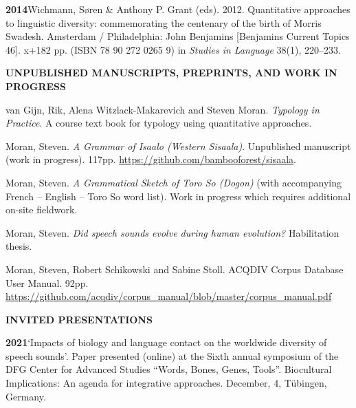 \documentclass[11pt]{article}
\newcommand{\hangpara}{
 \setlength{\parindent}{0in} %
 \hangindent=0.42in %
}
\begin{document}

\hangpara
{\bf 2014}\hspace{1ex}Wichmann, S{\o}ren \& Anthony P. Grant (eds). 2012. Quantitative approaches to linguistic diversity: commemorating the centenary of the birth of Morris Swadesh. Amsterdam / Philadelphia: John Benjamins [Benjamins Current Topics 46]. x+182 pp. (ISBN 78 90 272 0265 9) in \textit{Studies in Language} 38(1), 220--233.

\vskip 20pt
\begin{flushleft}
{\bf UNPUBLISHED MANUSCRIPTS, PREPRINTS, AND WORK IN PROGRESS}
\end{flushleft}

\hangpara
van Gijn, Rik, Alena Witzlack-Makarevich and Steven Moran. {\it Typology in Practice}. A course text book for typology using quantitative approaches.

\vskip 6pt
\hangpara
Moran, Steven. \textit{A Grammar of Isaalo (Western Sisaala)}. Unpublished manuscript (work in progress). 117pp. \url{https://github.com/bambooforest/sisaala}.

\vskip 6pt
\hangpara
Moran, Steven. \textit{A Grammatical Sketch of Toro So (Dogon)} (with accompanying French -- English -- Toro So word list). Work in progress which requires additional on-site fieldwork. 

\vskip 6pt
\hangpara
Moran, Steven. \textit{Did speech sounds evolve during human evolution?} Habilitation thesis.

\vskip 6pt
\hangpara
Moran, Steven, Robert Schikowski and Sabine Stoll. ACQDIV Corpus Database User Manual. 92pp. \url{https://github.com/acqdiv/corpus_manual/blob/master/corpus_manual.pdf}



\vskip 20pt
\begin{flushleft}
{\bf INVITED PRESENTATIONS}
\end{flushleft}

\hangpara
{\bf 2021}\hspace{1ex}`Impacts of biology and language contact on the worldwide diversity of speech sounds'. Paper presented (online) at the Sixth annual symposium of the DFG Center for Advanced Studies ``Words, Bones, Genes, Tools''. Biocultural Implications: An agenda for integrative approaches. December, 4, Tübingen, Germany.
\end{document}
